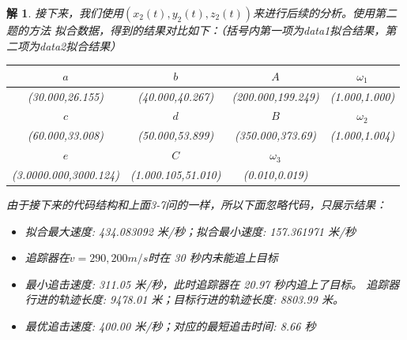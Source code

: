\documentclass[a4paper, 12pt]{ctexart}
\newtheorem*{theorem}{解}
\begin{document}
\begin{theorem}
接下来，我们使用$(x_2(t),y_2(t),z_2(t))$来进行后续的分析。使用第二题的方法
拟合数据，得到的结果对比如下：（括号内第一项为data1拟合结果，第二项为data2拟合结果）
\begin{table}[h]
    \centering
    \begin{tabular}{|c|c|c|c|}
        \hline
        $a$ & $b$ & $A$ & $\omega_1$ \\
        \hline
        (30.000,26.155) & (40.000,40.267) & (200.000,199.249) & (1.000,1.000) \\
        \hline
        $c$ & $d$ & $B$ & $\omega_2$ \\
        \hline
        (60.000,33.008) & (50.000,53.899) & (350.000,373.69) & (1.000,1.004) \\
        \hline
        $e$ & $C$ & $\omega_3$ & {} \\
        \hline
        (3.0000.000,3000.124) & (1.000.105,51.010) & (0.010,0.019) & {} \\
        \hline
    \end{tabular}
\end{table}

由于接下来的代码结构和上面3-7问的一样，所以下面忽略代码，只展示结果：
\begin{itemize}
    \item 拟合最大速度: 434.083092 米/秒；拟合最小速度: 157.361971 米/秒
    \item 追踪器在$v=290,200 m/s$时在 30 秒内未能追上目标
    \item 最小追击速度: 311.05 米/秒，此时追踪器在 20.97 秒内追上了目标。
    追踪器行进的轨迹长度: 9478.01 米；目标行进的轨迹长度: 8803.99 米。
    \item 最优追击速度: 400.00 米/秒；对应的最短追击时间: 8.66 秒
\end{itemize}



\end{theorem}
\end{document}
